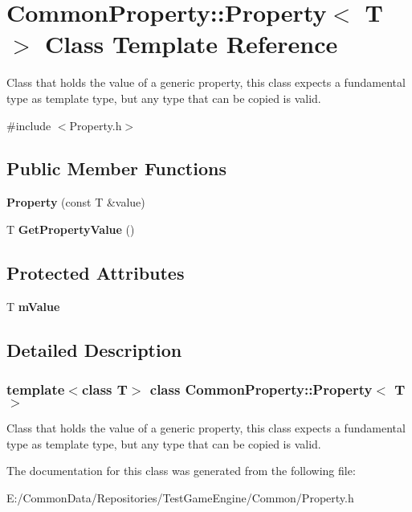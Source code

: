 \hypertarget{class_common_property_1_1_property}{}\section{Common\+Property\+::Property$<$ T $>$ Class Template Reference}
\label{class_common_property_1_1_property}


Class that holds the value of a generic property, this class expects a fundamental type as template type, but any type that can be copied is valid.  




{\ttfamily \#include $<$Property.\+h$>$}

\subsection*{Public Member Functions}
\begin{DoxyCompactItemize}
\item 
\mbox{\label{class_common_property_1_1_property_af97fecb0a0e93071551b36139293737a}} 
{\bfseries Property} (const T \&value)
\item 
\mbox{\label{class_common_property_1_1_property_a30e640823b85fb85f4b50a6318d5edfe}} 
T {\bfseries Get\+Property\+Value} ()
\end{DoxyCompactItemize}
\subsection*{Protected Attributes}
\begin{DoxyCompactItemize}
\item 
\mbox{\label{class_common_property_1_1_property_a3ef2010940cb6d08df59f7cd4071bb4a}} 
T {\bfseries m\+Value}
\end{DoxyCompactItemize}


\subsection{Detailed Description}
\subsubsection*{template$<$class T$>$\newline
class Common\+Property\+::\+Property$<$ T $>$}

Class that holds the value of a generic property, this class expects a fundamental type as template type, but any type that can be copied is valid. 

The documentation for this class was generated from the following file\+:\begin{DoxyCompactItemize}
\item 
E\+:/\+Common\+Data/\+Repositories/\+Test\+Game\+Engine/\+Common/Property.\+h\end{DoxyCompactItemize}
